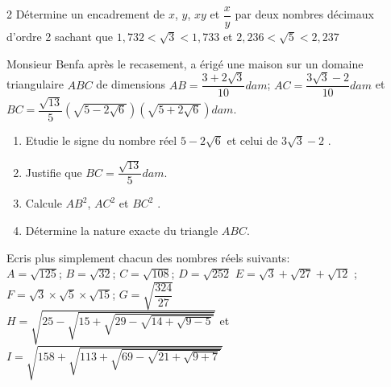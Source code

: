 \begin{multicols*}{2}
  	Détermine un encadrement de $x$, $y$, $xy$
  	et $\dfrac{x}{y}$   par deux nombres décimaux d'ordre 2 sachant que 
  	$1,732< \sqrt{3} <1,733$ et $2,236 <\sqrt{5} <2,237$
  	
  	\dures
  	 \begin{center}
  	\end{center}
  	Monsieur Benfa après le recasement, a érigé une maison sur un domaine triangulaire $ABC$ de dimensions $AB=\dfrac{3+2\sqrt{3}}{10} dam$; $AC=\dfrac{3\sqrt{3}-2}{10}dam$ et $BC=\dfrac{\sqrt{13}}{5}\left(\sqrt{5-2\sqrt{6}} \right)\left(\sqrt{5+2\sqrt{6}} \right)dam$.	
  	\begin{enumerate}
  		\item Etudie le signe du nombre réel  $5-2\sqrt{6}$ et celui de $3\sqrt{3}-2$  .
  		\item Justifie que  $BC=\dfrac{\sqrt{13}}{5}dam$.
  		\item Calcule $AB^2$, $AC^2$ et $BC^2$ .
  		\item Détermine la nature exacte du triangle $ABC$.
  	\end{enumerate} 
  	 	Ecris plus simplement chacun des nombres réels suivants: \\
  	 $ A=\sqrt{125} $; $ B=\sqrt{32} $; $ C=\sqrt{108} $; $ D=\sqrt{252} $
  	 $ E=\sqrt{3} + \sqrt{27}+ \sqrt{12}$ ; $ F= \sqrt{3}\times \sqrt{5}\times \sqrt{15} $; $ G=\sqrt{\dfrac{324}{27}} $\\
  	 $ H=\sqrt{25-\sqrt{15+\sqrt{29-\sqrt{14+\sqrt{9-5}}}}} $ et \\
  	 $ I=\sqrt{158+\sqrt{113+\sqrt{69-\sqrt{21+\sqrt{9+7}}}}} $
   \setcounter{q}{0}
  	

\end{multicols*}
